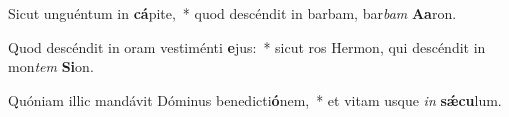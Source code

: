 \item Sicut unguéntum in \textbf{cá}pite,~* quod descéndit in barbam, bar\textit{bam} \textbf{A}\textbf{a}ron.
\item Quod descéndit in oram vestiménti \textbf{e}jus:~* sicut ros Hermon, qui descéndit in mon\textit{tem} \textbf{Si}on.
\item Quóniam illic mandávit Dóminus benedicti\textbf{ó}nem,~* et vitam usque \textit{in} \textbf{sǽ}\textbf{cu}lum.
